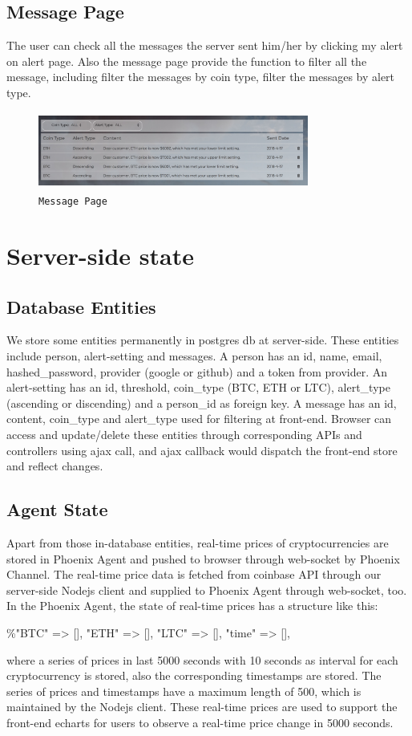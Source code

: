 \subsection{Message Page}
The user can check all the messages the server sent him/her by clicking my alert on alert
page. Also the message page provide the function to filter all the message, including filter
the messages by coin type, filter the messages by alert type.

\begin{figure}[!htb]
\includegraphics[height=1.0in, width=3.5in]{message.jpg}
\caption{\texttt{Message Page}}
\end{figure}





\section{Server-side state}
\subsection{Database Entities}
We store some entities permanently in postgres db at server-side. 
These entities include person, alert-setting and messages. 
A person has an id, name, email, hashed\_password, provider 
(google or github) and a token from provider. An alert-setting 
has an id, threshold, coin\_type (BTC, ETH or LTC), alert\_type 
(ascending or discending) and a person\_id as foreign key. 
A message has an id, content, coin\_type and alert\_type used 
for filtering at front-end. Browser can access and update/delete 
these entities through corresponding APIs and controllers using 
ajax call, and ajax callback would dispatch the front-end store 
and reflect changes.
\subsection{Agent State}
Apart from those in-database entities, real-time prices of 
cryptocurrencies are stored in Phoenix Agent and pushed to 
browser through web-socket by Phoenix Channel. The real-time 
price data is fetched from coinbase API through our server-side 
Nodejs client and supplied to Phoenix Agent through web-socket, 
too. In the Phoenix Agent, the state of real-time prices has 
a structure like this: 
\begin{center} 
\%{"BTC" => [], "ETH" => [], "LTC" => [], "time" => []}, 
\end{center}
where a series of prices in last 5000 seconds 
with 10 seconds as interval for each cryptocurrency is stored, 
also the corresponding timestamps are stored. The series of prices 
and timestamps have a maximum length of 500, which is maintained 
by the Nodejs client. These real-time prices are used to support 
the front-end echarts for users to observe a real-time price 
change in 5000 seconds. 
